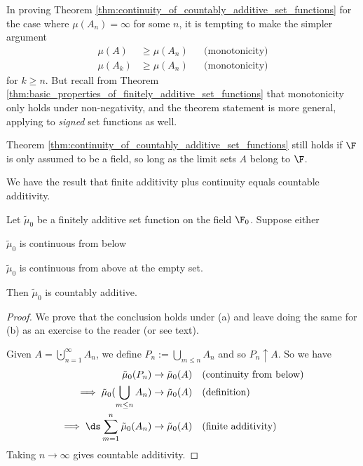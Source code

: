 \documentclass{article} %
\newcommand{\fasf}{\tilde{\mu}_0}
\begin{document}
\begin{remark}

In proving Theorem \ref{thm:continuity_of_countably_additive_set_functions}  for the case where $\mu(A_n) = \infty$ for some $n$, it is tempting to make the simpler argument 
\begin{align*}
\mu(A) & \geq \mu(A_n) && \text{(monotonicity)}\\	
\mu(A_k) & \geq \mu(A_n) && \text{(monotonicity)}	 
\end{align*}
for $k \geq n$.  But recall from Theorem \ref{thm:basic_properties_of_finitely_additive_set_functions} that monotonicity only holds under non-negativity, and the theorem statement is more general, applying to \textit{signed} set functions as well. 
\end{remark}

\begin{remark}
Theorem \ref{thm:continuity_of_countably_additive_set_functions} still holds if $\F$ is only assumed to be a field, so long as the limit sets $A$ belong to $\F$.  %
\end{remark}

We have the result that finite additivity plus continuity equals countable additivity. 

\begin{theorem}
Let $\fasf$ be a finitely additive set function on the field $\F_0$.  Suppose either
\begin{alphabate}
\item $\fasf$ is continuous from below
\item $\fasf$ is continuous from above at the empty set.	
\end{alphabate}
Then $\fasf$ is countably additive.
\label{thm:finite_additivity_plus_continuity_gives_countable_additivity}
\end{theorem}

\begin{proof}
We prove that the conclusion holds under (a) and leave doing the same for (b) as an exercise to the reader (or see text). 	%

Given $A = \bigcupdot_{n=1}^\infty A_n$, we define $P_n := \bigcup_{m \leq n} A_n$ and so $P_n \uparrow A$.   So we have
\begin{align*}
\fasf(P_n) &\to \fasf(A) && \text{(continuity from below)} \\
\implies \fasf(\bigcup_{m \leq n} A_n) &\to \fasf(A) && \text{(definition)} \\	
\implies \ds\sum_{m=1}^n \fasf(A_n) &\to \fasf(A) && \text{(finite additivity)} \\
\end{align*}
Taking $n \to \infty$ gives countable additivity.
\end{proof}
\end{document}
